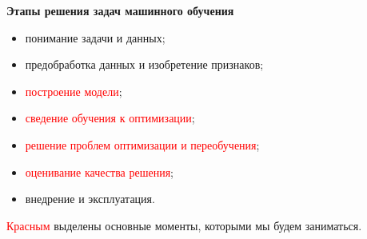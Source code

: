 \documentclass{article}
\begin{document}
\textbf{Этапы решения задач машинного обучения}
\begin{itemize}
\item понимание задачи и данных;
\item предобработка данных и изобретение признаков;
\item \textcolor{red}{построение модели};
\item \textcolor{red}{сведение обучения к оптимизации};
\item \textcolor{red}{решение проблем оптимизации и переобучения};
\item \textcolor{red}{оценивание качества решения};
\item внедрение и эксплуатация.
\end{itemize}

\textcolor{red}{Красным} выделены основные моменты, которыми мы будем заниматься.
\end{document}
